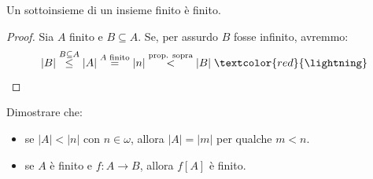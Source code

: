 \begin{corollary}[Ovvietà]
	Un sottoinsieme di un insieme finito è finito.
\end{corollary}

\begin{proof}
	Sia $A$ finito e $B \subseteq A$. Se, per assurdo $B$ fosse infinito, avremmo:
	\[ |B| \overset{B \subseteq A}{\leq} |A| \overset{\text{$A$ finito}}{=} |n| \overset{\text{prop. sopra}}{<} |B| \;\textcolor{red}{\lightning}
		\]	
\end{proof}

\begin{exercise}
	\label{disuguaglianze_senza_AC1}
	Dimostrare che:
	\begin{itemize}
		\item se $|A| < |n|$ con $n \in \omega$, allora $|A| = |m|$ per qualche $m < n$.
		\item se $A$ è finito e $f : A \rightarrow B$, allora $f[A]$ è finito.
	\end{itemize}	
\end{exercise}


